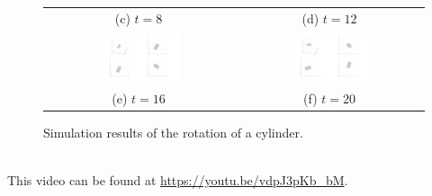 \documentclass{article}
\begin{document}
\begin{figure}[h!]
\begin{tabular}{cc}
    (c) $t = 8$ & (d) $t = 12$ \\
    \includegraphics[width=0.45\textwidth]{assets/figure_16.png} & \includegraphics[width=0.45\textwidth]{assets/figure_20.png} \\
    (e) $t = 16$ & (f) $t = 20$ \\
  \end{tabular}
  \caption{Simulation results of the rotation of a cylinder.}
  \label{fig:simulation_results}
\end{figure}
\\
This video can be found at \url{https://youtu.be/vdpJ3pKb_bM}.
\end{document}
